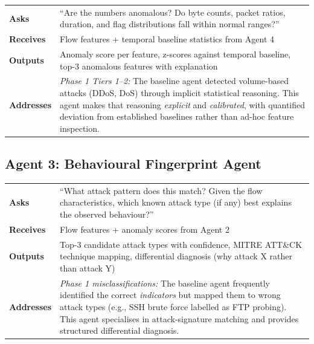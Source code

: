 \documentclass[12pt, a4paper, oneside]{report}
\begin{document}
\begin{table}[H]
\centering
\begin{tabular}{@{}lp{10cm}@{}}
\toprule
\textbf{Asks}     & ``Are the numbers anomalous? Do byte counts, packet ratios,
                     duration, and flag distributions fall within normal ranges?'' \\
\textbf{Receives}  & Flow features + temporal baseline statistics from Agent 4 \\
\textbf{Outputs}   & Anomaly score per feature, z-scores against temporal baseline,
                     top-3 anomalous features with explanation \\
\textbf{Addresses} & \emph{Phase 1 Tiers 1--2:} The baseline agent detected
                     volume-based attacks (DDoS, DoS) through implicit statistical
                     reasoning. This agent makes that reasoning \emph{explicit}
                     and \emph{calibrated}, with quantified deviation from
                     established baselines rather than ad-hoc feature inspection. \\
\bottomrule
\end{tabular}
\end{table}

\subsection{Agent 3: Behavioural Fingerprint Agent}

\begin{table}[H]
\centering
\begin{tabular}{@{}lp{10cm}@{}}
\toprule
\textbf{Asks}     & ``What attack pattern does this match? Given the flow
                     characteristics, which known attack type (if any) best
                     explains the observed behaviour?'' \\
\textbf{Receives}  & Flow features + anomaly scores from Agent 2 \\
\textbf{Outputs}   & Top-3 candidate attack types with confidence, MITRE ATT\&CK
                     technique mapping, differential diagnosis (why attack X
                     rather than attack Y) \\
\textbf{Addresses} & \emph{Phase 1 misclassifications:} The baseline agent
                     frequently identified the correct \emph{indicators} but
                     mapped them to wrong attack types (e.g., SSH brute force
                     labelled as FTP probing). This agent specialises in
                     attack-signature matching and provides structured
                     differential diagnosis. \\
\bottomrule
\end{tabular}
\end{table}
\end{document}
